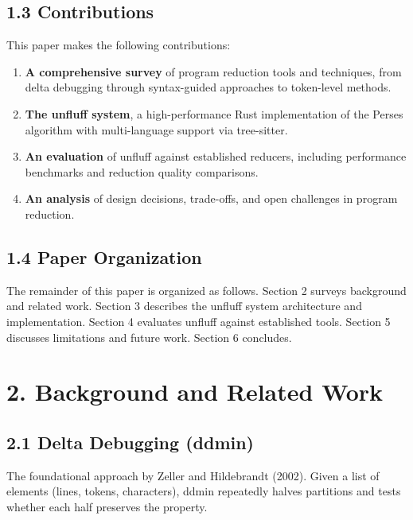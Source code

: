 \documentclass[
  letterpaper,
]{article}
\providecommand{\tightlist}{%
  \setlength{\itemsep}{0pt}\setlength{\parskip}{0pt}}
\begin{document}
\subsection{1.3 Contributions}\label{contributions}

This paper makes the following contributions:

\begin{enumerate}
\def\labelenumi{\arabic{enumi}.}
\tightlist
\item
  \textbf{A comprehensive survey} of program reduction tools and
  techniques, from delta debugging through syntax-guided approaches to
  token-level methods.
\item
  \textbf{The unfluff system}, a high-performance Rust implementation of
  the Perses algorithm with multi-language support via tree-sitter.
\item
  \textbf{An evaluation} of unfluff against established reducers,
  including performance benchmarks and reduction quality comparisons.
\item
  \textbf{An analysis} of design decisions, trade-offs, and open
  challenges in program reduction.
\end{enumerate}

\subsection{1.4 Paper Organization}\label{paper-organization}

The remainder of this paper is organized as follows. Section 2 surveys
background and related work. Section 3 describes the unfluff system
architecture and implementation. Section 4 evaluates unfluff against
established tools. Section 5 discusses limitations and future work.
Section 6 concludes.

\section{2. Background and Related
Work}\label{background-and-related-work}

\subsection{2.1 Delta Debugging (ddmin)}\label{delta-debugging-ddmin}

The foundational approach by Zeller and Hildebrandt (2002). Given a list
of elements (lines, tokens, characters), ddmin repeatedly halves
partitions and tests whether each half preserves the property.
\end{document}
